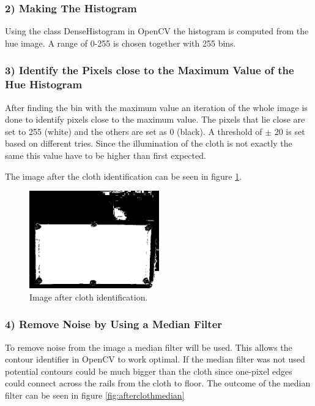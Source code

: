 \subsubsection{2) Making The Histogram}
Using the class DenseHistogram in OpenCV the histogram is computed from the hue image. A range of 0-255 is chosen together with 255 bins.

\subsubsection{3) Identify the Pixels close to the Maximum Value of the Hue Histogram}
After finding the bin with the maximum value an iteration of the whole image is done to identify pixels close to the maximum value. The pixels that lie close are set to 255 (white) and the others are set as 0 (black). A threshold of $\pm$ 20 is set based on different tries. Since the illumination of the cloth is not exactly the same this value have to be higher than first expected.

The image after the cloth identification can be seen in figure \ref{fig:aftercloth}.

\begin{figure}[H]
\begin{center}
\leavevmode
\includegraphics[width=0.5\textwidth]{images/aftercloth}
\end{center}
\caption{Image after cloth identification.}
\label{fig:aftercloth}
\end{figure}

\subsubsection{4) Remove Noise by Using a Median Filter}
To remove noise from the image a median filter will be used. This allows the contour identifier in OpenCV to work optimal. If the median filter was not used potential contours could be much bigger than the cloth since one-pixel edges could connect across the rails from the cloth to floor. The outcome of the median filter can be seen in figure \ref{fig:afterclothmedian}

